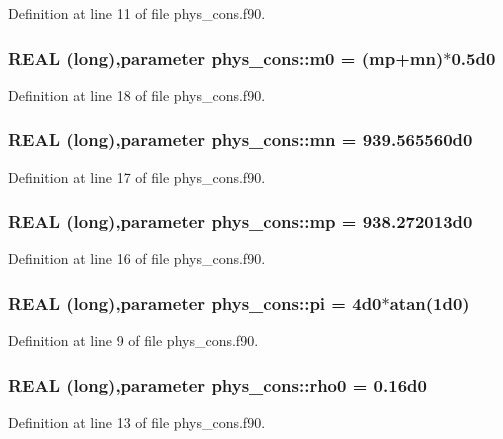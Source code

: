 Definition at line 11 of file phys\_\-cons.f90.

\hypertarget{namespacephys__cons_a2e392d52d36b5c1db0d17928aa40f35b}{
\subsubsection[{m0}]{\setlength{\rightskip}{0pt plus 5cm}REAL (long),parameter {\bf phys\_\-cons::m0} = ({\bf mp}+{\bf mn})$\ast$0.5d0}}
\label{namespacephys__cons_a2e392d52d36b5c1db0d17928aa40f35b}


Definition at line 18 of file phys\_\-cons.f90.

\hypertarget{namespacephys__cons_ad68aaba74b75e1e13f1367c1eb0904c1}{
\subsubsection[{mn}]{\setlength{\rightskip}{0pt plus 5cm}REAL (long),parameter {\bf phys\_\-cons::mn} = 939.565560d0}}
\label{namespacephys__cons_ad68aaba74b75e1e13f1367c1eb0904c1}


Definition at line 17 of file phys\_\-cons.f90.

\hypertarget{namespacephys__cons_ae2a4cb4e421fe399f19d0729b5617fed}{
\subsubsection[{mp}]{\setlength{\rightskip}{0pt plus 5cm}REAL (long),parameter {\bf phys\_\-cons::mp} = 938.272013d0}}
\label{namespacephys__cons_ae2a4cb4e421fe399f19d0729b5617fed}


Definition at line 16 of file phys\_\-cons.f90.

\hypertarget{namespacephys__cons_aae3c6cb8ae765b0262bb110ff739ba9d}{
\subsubsection[{pi}]{\setlength{\rightskip}{0pt plus 5cm}REAL (long),parameter {\bf phys\_\-cons::pi} = 4d0$\ast$atan(1d0)}}
\label{namespacephys__cons_aae3c6cb8ae765b0262bb110ff739ba9d}


Definition at line 9 of file phys\_\-cons.f90.

\hypertarget{namespacephys__cons_a4b10513970a98ad78b85723c60d9a8b6}{
\subsubsection[{rho0}]{\setlength{\rightskip}{0pt plus 5cm}REAL (long),parameter {\bf phys\_\-cons::rho0} = 0.16d0}}
\label{namespacephys__cons_a4b10513970a98ad78b85723c60d9a8b6}


Definition at line 13 of file phys\_\-cons.f90.

